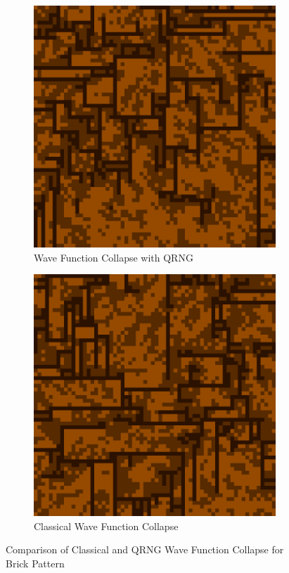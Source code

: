 \documentclass[10pt]{article}
\begin{document}
\begin{figure}[h]
\centering
\begin{subfigure}{.5\textwidth}
  \centering
  \includegraphics[scale=0.2]{bricksResultQRNG}
  \caption{Wave Function Collapse with QRNG}
  \label{fig:sub1}
\end{subfigure}%
\begin{subfigure}{.5\textwidth}
  \centering
  \includegraphics[scale=0.2]{bricksResultClassical}
  \caption{Classical Wave Function Collapse}
  \label{fig:sub2}
\end{subfigure}
\caption{Comparison of Classical and QRNG Wave Function Collapse for Brick Pattern}
\label{fig:test}
\end{figure}
\end{document}
